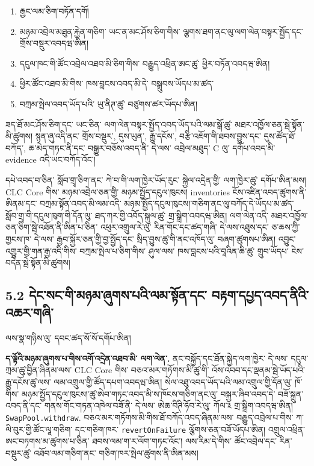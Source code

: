\documentclass[11pt]{article}
\begin{document}
\begin{enumerate}[leftmargin=*]
\item རྒྱང་ལམ་ཅིག་བཏོན་དགོ།
\item མཉམ་འབྲེལ་མཐུན་རྐྱེན་གཅིག་ ཡང་ན་མང་ཤོས་ཅིག་གིས་ ལྕགས་ཐག་ནང་ལུ་ལག་ལེན་བསྟར་སྤྱོད་དང་ གྲོས་བསྡུར་འབདཝ་ཨིན།
\item དངུལ་ཁང་གི་ཚོང་འབྲེལ་འཐབ་མི་ཅིག་གིས་ བརྒྱུད་འཕྲིན་ཨང་ཚུ་ ཕྱིར་བཏོན་འབདཝ་ཨིན།
\item ཕྱིར་ཚོང་འཐབ་མི་གིས་ ཁས་བླངས་འབད་མི་དེ་ བསྒྲུབས་ཡོདཔ་མ་ཚད་
\item བཀྲམ་སྤེལ་འབད་ཡོད་པའི་ ཡུ་ནིཊ་ཚུ་ བཙུགས་ཚར་ཡོདཔ་ཨིན།
\end{enumerate}
ཟད་ཐོ་མང་ཤོས་ཅིག་དང་ ཡང་ཅིན་ ལག་ལེན་བསྟར་སྤྱོད་འབད་ཡོད་པའི་ལམ་སྒོ་ཚུ་ མཐར་འཁྱོལ་ཅན་སྦེ་སྟོན་མི་ཚུགས། སྙན་ཞུ་འདི་ནང་ གྲོས་བསྡུར་, དུས་ཡུན་, རྒྱུ་དངོས་, བརྩི་འཇོག་གི་ཐབས་བྱུས་དང་ དུས་ཚོད་ཐོ་བཀོད་, ཆ་མེད་གཏང་ནི་དང་ བསྒྱུར་བཅོས་འབད་ནི་ དེ་ལས་ འབྲེལ་མཐུད་ C ལུ་ དགོཔ་འབད་མི་ evidence འདི་ཡང་བཀོད་འོང་།

དཔེ་འབད་བ་ཅིན་ སློབ་གྲྭ་ཅིག་ནང་ ཀེ་བ་གི་ལག་ཁྱེར་ཡོད་རུང་ སྐྱེལ་འདྲེན་གྱི་ ལག་ཁྱེར་ཚུ་ དགོཔ་ཨིན་མས། CLC Core གིས་ མཉམ་འབྲེལ་ཅན་གྱི་ མཉམ་སྤྱོད་དངུལ་ཁུངས། inventories ངོས་འཛིན་འབད་ཚུགས་ནི་ཨིནམ་དང་ བཀྲམ་སྟོན་འབད་མི་ལམ་འདི་ མཉམ་སྤྱོད་དངུལ་ཁུངས།་གཅིག་ནང་ལུ་བཀོད་དེ་ཡོདཔ་མ་ཚད་ སློབ་གྲྭ་གི་དངུལ་ཁུག་གི་དོན་ལུ་ ཐད་ཀར་གྱི་འབོད་སྐུལ་ཚུ་ གྲ་སྒྲིག་འབདཝ་ཨིན། ལག་ལེན་འདི་ མཐར་འཁྱོལ་ཅན་ཅིག་སྦེ་འཐོན་ནི་ཨིན་པ་ཅིན་ འཕུར་འགྲུལ་རེ་ལུ་ རིན་གོང་དང་ཚད་གཞི་ དེ་ལས་འཐུས་དང་ ཅ་ཆས་ཀྱི་གྱངས་ཁ་ དེ་ལས་ རྒྱབ་སྐྱོར་ཅན་གྱི་བྱ་སྤྱོད་དང་ སྲིད་བྱུས་ཚུ་གི་ནང་འཁོད་ལུ་ བཞག་ཚུགསཔ་ཨིན། འབྱུང་འགྱུར་གྱི་གན་རྒྱ་འདི་གིས་ བཀྲམ་སྤེལ་པ་ཅིག་གིས་ ཤུལ་ལས་ ཁས་བླངས་པའི་བཱའིན་ཆི་ཚུ་ གྲུབ་ཡོདཔ་ ངེས་བདེན་སྦེ་སྟོན་མི་ཚུགས།

\subsection*{5.2 དེང་སང་གི་མཉམ་ཞུགས་པའི་ལམ་སྟོན་དང་ བརྟག་དཔྱད་འབད་ནིའི་འཆར་གཞི་}

ལས་སྣ་གཉིས་ལུ་ དབང་ཚད་སོ་སོ་དགོཔ་ཨིན།

\textbf{ད་ལྟོའི་མཉམ་ཞུགས་པ་གིས་འགོ་འདྲེན་འཐབ་མི་ ལག་ལེན་.} ནང་བསྐྱོད་དང་ཐོན་སྐྱེད་ལག་ཁྱེར་ དེ་ལས་ དངུལ་ཀྲམ་ཚུ་བྱིན་ཞིནམ་ལས་ CLC Core གིས་ བཅའ་མར་གཏོགས་མི་ཚུ་གི་ འོས་འབབ་དང་ལྡནམ་སྦེ་ཡོད་པའི་རྒྱུ་དངོས་ཚུ་ལས་ ལམ་འགྲུལ་གྱི་ཚོད་དཔག་འབདཝ་ཨིན། སེལ་འཐུ་འབད་ཡོད་པའི་ལམ་འགྲུལ་གྱི་དོན་ལུ་ ཁོ་གིས་ མཉམ་སྤྱོད་དངུལ་ཁུངས།་ཚུ་ཨེབ་གཏང་འབད་མི་ས་ཁོངས་གཅིག་ནང་ལུ་ བསྐྱར་ཞིབ་འབད་དེ་ བཟོ་སྐྲུན་འབད་ནི་དང་ གནས་གོང་གཏན་འཁེལ་བཟོ་ནི་ དེ་ལས་ ཨེཆ་བིཊི་ཧོབ་རེ་ལུ་ ཀོལ་༣ གྲ་སྒྲིག་འབདཝ་ཨིན། \texttt{SwapPool.withdraw}. བཅའ་མར་གཏོགས་མི་གིས་ཐོ་བཀོད་འབད་ཞིནམ་ལས་ བརྒྱུད་འབྲེལ་པ་གིས་ ཀ་ལི་བུར་གྱི་ཚོང་ལཱ་གཅིག་ དང་གཅིག་ཁར་ \texttt{revertOnFailure} ལྕོགས་ཅན་བཟོ་ཡོདཔ་ཨིན། འགྲུལ་འཕྲིན་ཨང་བཏགས་མ་ཚུགས་པ་ཅིན་ ཐབས་ལམ་ག་ར་ལོག་གཏང་འོང་། ལས་རིམ་དེ་གིས་ ཚོང་འབྲེལ་དང་ རིན་བསྡུར་ཚུ་ འཐོབ་ལམ་གཅིག་ནང་ གཅིག་ཁར་སྤེལ་ཚུགས་ནི་ཨིན་མས།
\end{document}
